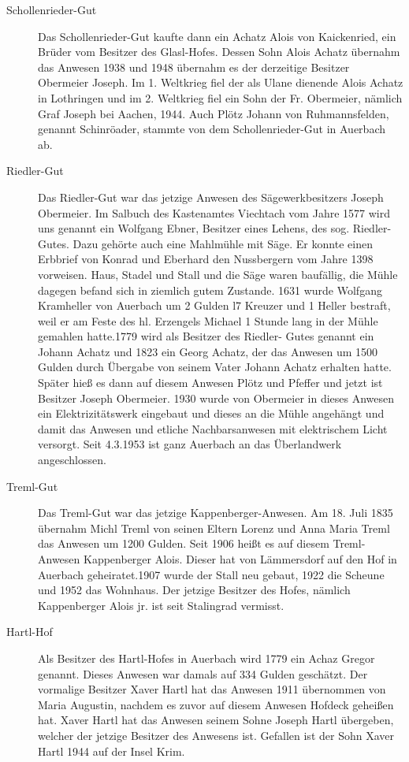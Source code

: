\documentclass{book}
\begin{document}
\begin{description}
\item[Schollenrieder-Gut] Das Schollenrieder-Gut kaufte dann ein Achatz
Alois von Kaickenried, ein Brüder vom Besitzer des Glasl-Hofes. Dessen
Sohn Alois Achatz übernahm das Anwesen 1938 und 1948 übernahm es der
derzeitige Besitzer Obermeier Joseph. Im 1. Weltkrieg fiel der als Ulane
dienende Alois Achatz in Lothringen und im 2. Weltkrieg fiel ein Sohn
der Fr. Obermeier, nämlich Graf Joseph bei Aachen, 1944. Auch Plötz
Johann von Ruhmannsfelden, genannt Schinröader, stammte von dem
Schollenrieder-Gut in Auerbach ab.

\item[Riedler-Gut] Das Riedler-Gut war das jetzige Anwesen des
Sägewerkbesitzers Joseph Obermeier. Im Salbuch des Kastenamtes Viechtach
vom Jahre 1577 wird uns genannt ein Wolfgang Ebner, Besitzer eines
Lehens, des sog. Riedler-Gutes. Dazu gehörte auch eine Mahlmühle mit
Säge. Er konnte einen Erbbrief von Konrad und Eberhard den Nussbergern
vom Jahre 1398 vorweisen. Haus, Stadel und Stall und die Säge waren
baufällig, die Mühle dagegen befand sich in ziemlich gutem Zustande.
1631 wurde Wolfgang Kramheller von Auerbach um 2 Gulden l7 Kreuzer und 1
Heller bestraft, weil er am Feste des hl. Erzengels Michael 1 Stunde
lang in der Mühle gemahlen hatte.1779 wird als Besitzer des Riedler-
Gutes genannt ein Johann Achatz und 1823 ein Georg Achatz, der das
Anwesen um 1500 Gulden durch Übergabe von seinem Vater Johann Achatz
erhalten hatte. Später hieß es dann auf diesem Anwesen Plötz und Pfeffer
und jetzt ist Besitzer Joseph Obermeier. 1930 wurde von Obermeier in
dieses Anwesen ein Elektrizitätswerk eingebaut und dieses an die Mühle
angehängt und damit das Anwesen und etliche Nachbarsanwesen mit
elektrischem Licht versorgt. Seit 4.3.1953 ist ganz Auerbach an das
Überlandwerk angeschlossen.

\item[Treml-Gut] Das Treml-Gut war das jetzige Kappenberger-Anwesen. Am
18. Juli 1835 übernahm Michl Treml von seinen Eltern Lorenz und Anna
Maria Treml das Anwesen um 1200 Gulden. Seit 1906 heißt es auf diesem
Treml-Anwesen Kappenberger Alois. Dieser hat von Lämmersdorf auf den Hof
in Auerbach geheiratet.1907 wurde der Stall neu gebaut, 1922 die Scheune
und 1952 das Wohnhaus. Der jetzige Besitzer des Hofes, nämlich
Kappenberger Alois jr. ist seit Stalingrad vermisst.

\item[Hartl-Hof] Als Besitzer des Hartl-Hofes in Auerbach wird 1779 ein
Achaz Gregor genannt. Dieses Anwesen war damals auf 334 Gulden
geschätzt. Der vormalige Besitzer Xaver Hartl hat das Anwesen 1911
übernommen von Maria Augustin, nachdem es zuvor auf diesem Anwesen
Hofdeck geheißen hat. Xaver Hartl hat das Anwesen seinem Sohne Joseph
Hartl übergeben, welcher der jetzige Besitzer des Anwesens ist. Gefallen
ist der Sohn Xaver Hartl 1944 auf der Insel Krim.


\end{description}
\end{document}
